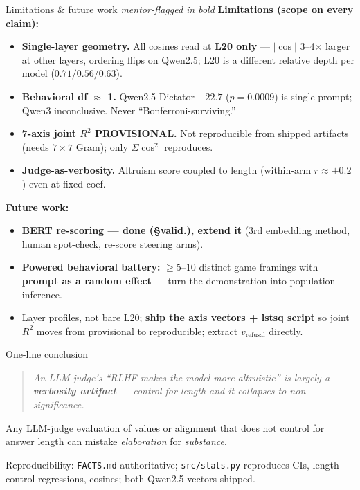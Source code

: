 \documentclass[aspectratio=169,11pt]{beamer}
\begin{document}
\begin{frame}{Limitations \& future work \hfill {\small\itshape mentor-flagged in bold}}
  \textbf{Limitations (scope on every claim):}
  \begin{itemize}
    \footnotesize
    \item \textbf{Single-layer geometry.} All cosines read at \textbf{L20 only} --- $|\cos|$ 3--4$\times$
      larger at other layers, ordering flips on Qwen2.5; L20 is a different relative depth per model ($0.71/0.56/0.63$).
    \item \textbf{Behavioral df $\approx$ 1.} Qwen2.5 Dictator $-22.7$ ($p{=}0.0009$) is single-prompt; Qwen3 inconclusive. Never ``Bonferroni-surviving.''
    \item \textbf{7-axis joint $R^2$ PROVISIONAL.} Not reproducible from shipped artifacts (needs $7{\times}7$ Gram); only $\Sigma\cos^2$ reproduces.
    \item \textbf{Judge-as-verbosity.} Altruism score coupled to length (within-arm $r\approx+0.2$) even at fixed coef.
  \end{itemize}
  \textbf{Future work:}
  \begin{itemize}
    \footnotesize
    \item \textbf{BERT re-scoring --- done (\S valid.), extend it} (3rd embedding method, human spot-check, re-score steering arms).
    \item \textbf{Powered behavioral battery:} $\geq$5--10 distinct game framings with \textbf{prompt as a random effect} --- turn the demonstration into population inference.
    \item Layer profiles, not bare L20; \textbf{ship the axis vectors + lstsq script} so joint $R^2$ moves from provisional to reproducible; extract $v_{\text{refusal}}$ directly.
  \end{itemize}
\end{frame}

\begin{frame}{One-line conclusion}
  \vspace{1.2em}
  \begin{quote}
    \Large\itshape An LLM judge's ``RLHF makes the model more altruistic'' is largely a
    \textbf{verbosity artifact} --- control for length and it collapses to non-significance.
  \end{quote}
  \vspace{1em}
  \normalsize
  Any LLM-judge evaluation of values or alignment that does not control for answer length can
  mistake \emph{elaboration} for \emph{substance}.
  \vspace{1.5em}
  \begin{flushright}
    \footnotesize Reproducibility: \texttt{FACTS.md} authoritative; \texttt{src/stats.py} reproduces
    CIs, length-control regressions, cosines; both Qwen2.5 vectors shipped.
  \end{flushright}
\end{frame}
\end{document}
